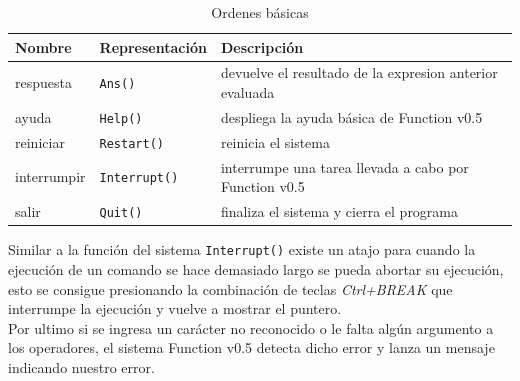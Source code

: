       \begin{longtable}[c]{|l|l|l|}
         \caption{Ordenes básicas}\label{tb:basicord} \\ \hline
         {\bf Nombre} & {\bf Representación} & {\bf Descripción}\\ \hline
         respuesta    & \texttt{Ans()} & devuelve el resultado de la expresion anterior evaluada\\ \hline
         ayuda    & \texttt{Help()} & despliega la ayuda básica de Function v0.5\\ \hline
         reiniciar & \texttt{Restart()} & reinicia el sistema\\ \hline
         interrumpir    & \texttt{Interrupt()} & interrumpe una tarea llevada a cabo por Function v0.5\\ \hline
         salir    & \texttt{Quit()} & finaliza el sistema y cierra el programa\\ \hline
      \end{longtable}
      
      \begin{fxcode}
      \end{fxcode}
      
      \begin{fxcode}
      \end{fxcode}
      
      \begin{fxcode}
      \end{fxcode}
      
      \begin{fxcode}
      \end{fxcode}
      
      \begin{fxcode}
      \end{fxcode}
      
      Similar a la función del sistema \texttt{Interrupt()} existe un atajo para cuando la ejecución de un comando se hace demasiado largo se pueda abortar su ejecución, esto se consigue presionando la combinación de teclas {\it Ctrl+BREAK} que interrumpe la ejecución y vuelve a mostrar el puntero.
      \\
      
      Por ultimo si se ingresa un carácter no reconocido o le falta algún argumento a los operadores, el sistema Function v0.5 detecta dicho error y lanza un mensaje indicando nuestro error.
      

